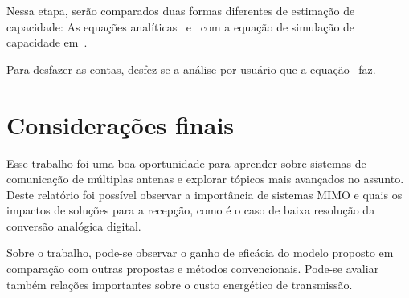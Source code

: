 \documentclass{article}
\begin{document}
Nessa etapa, serão comparados duas formas diferentes de estimação de capacidade: As equações analíticas~\cite[eq. 48]{li.etal_2017a} e~\cite[eq. 49]{li.etal_2017a} com a equação de simulação de capacidade em~\cite[eq. 42]{li.etal_2017a}. 

Para desfazer as contas, desfez-se a análise por usuário que a equação~\cite[eq. 42]{li.etal_2017a} faz.



\section{Considerações finais}
\label{sec:consideracoes_finais}

Esse trabalho foi uma boa oportunidade para aprender sobre sistemas de comunicação de múltiplas antenas e explorar tópicos mais avançados no assunto. Deste relatório foi possível observar a importância de sistemas MIMO e quais os impactos de soluções para a recepção, como é o caso de baixa resolução da conversão analógica digital. 

Sobre o trabalho, pode-se observar o ganho de eficácia do modelo proposto em comparação com outras propostas e métodos convencionais. Pode-se avaliar também relações importantes sobre o custo energético de transmissão.

\printbibliography
\end{document}
